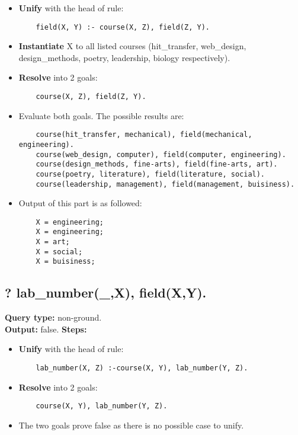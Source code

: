 \begin{itemize}
    \item \textbf{Unify} with the head of rule:
    \begin{lstlisting}
    field(X, Y) :- course(X, Z), field(Z, Y).
    \end{lstlisting}
\item \textbf{Instantiate} X to all listed courses (hit\_transfer, web\_design, design\_methods, poetry, leadership, biology respectively).
\item \textbf{Resolve} into 2 goals:
    \begin{lstlisting}
    course(X, Z), field(Z, Y).
    \end{lstlisting}
\item Evaluate both goals. The possible results are:
    \begin{lstlisting}
    course(hit_transfer, mechanical), field(mechanical, engineering). 
    course(web_design, computer), field(computer, engineering).
    course(design_methods, fine-arts), field(fine-arts, art).
    course(poetry, literature), field(literature, social).
    course(leadership, management), field(management, buisiness).
    \end{lstlisting}
\item Output of this part is as followed:
    \begin{lstlisting}
    X = engineering;
    X = engineering;
    X = art;
    X = social;
    X = buisiness;
    \end{lstlisting}
\end{itemize}


\subsection{? lab\_number(\_,X), field(X,Y).}
\textbf{Query type: } non-ground. \\
\textbf{Output:} false.
\textbf{Steps:}
\begin{itemize}
    \item \textbf{Unify} with the head of rule:
    \begin{lstlisting}
    lab_number(X, Z) :-course(X, Y), lab_number(Y, Z).
    \end{lstlisting}
    \item \textbf{Resolve} into 2 goals:
    \begin{lstlisting}
    course(X, Y), lab_number(Y, Z).
    \end{lstlisting}
    \item The two goals prove false as there is no possible case to unify.  
\end{itemize}


